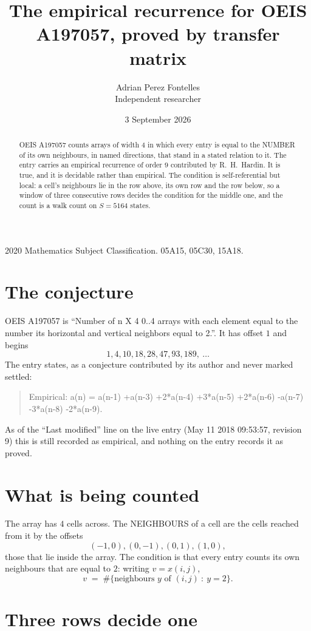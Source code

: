 \documentclass[11pt,a4paper]{article}
\title{The empirical recurrence for OEIS A197057, proved by transfer matrix}
\author{Adrian Perez Fontelles\\ \small Independent researcher}
\date{3 September 2026}
\theoremstyle{plain}
\theoremstyle{definition}
\begin{document}
\maketitle

\begin{abstract}
OEIS A197057 counts arrays of width $4$ in which every entry is equal to the NUMBER of its own
neighbours, in named directions, that stand in a stated relation to it. The entry carries an
empirical recurrence of order $9$ contributed by R.~H.~Hardin. It is true, and it is
decidable rather than empirical. The condition is self-referential but local: a cell's
neighbours lie in the row above, its own row and the row below, so a window of three
consecutive rows decides the condition for the middle one, and the count is a walk count on
$S=5164$ states.
\end{abstract}

\noindent\small 2020 Mathematics Subject Classification. 05A15, 05C30, 15A18.\normalsize

\section{The conjecture}

OEIS A197057 is ``Number of n X 4 0..4 arrays with each element equal to the number its horizontal and vertical neighbors equal to 2.''. It has offset $1$ and begins
\[
1, 4, 10, 18, 28, 47, 93, 189,\ \dots
\]
The entry states, as a conjecture contributed by its author and never marked settled:
\begin{quote}
Empirical: a(n) = a(n-1) +a(n-3) +2*a(n-4) +3*a(n-5) +2*a(n-6) -a(n-7) -3*a(n-8) -2*a(n-9).
\end{quote}
As of the ``Last modified'' line on the live entry (May 11 2018 09:53:57, revision 9) this is still
recorded as empirical, and nothing on the entry records it as proved.

\section{What is being counted}

The array has $4$ cells across. The NEIGHBOURS of a cell are the cells reached from it by the
offsets
\[
(-1,0), (0,-1), (0,1), (1,0),
\]
those that lie inside the array. The condition is that every entry counts its own neighbours
that are equal to $2$: writing $v=x(i,j)$,
\[
v\;=\;\#\{\text{neighbours } y \text{ of } (i,j)\ :\ y=2\} .
\]


\section{Three rows decide one}
\end{document}
